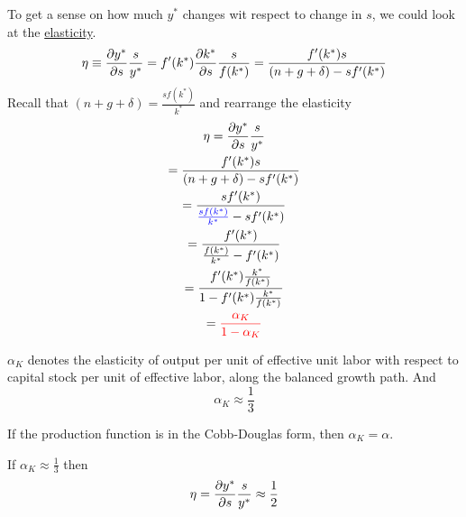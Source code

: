 \documentclass[11pt]{article}
\begin{document}
			\par To get a sense on how much $y^*$ changes wit respect to change in $s$, we could look at the \ul{elasticity}.
			\begin{equation}
				\eta \equiv \frac{\partial{y^*}}{\partial{s}}\frac{s}{y^*} = f'(k^*) \frac{\partial{k^*}}{\partial{s}} \frac{s}{f(k^*)} = \frac{f'(k^*)s}{(n+g+\delta) - sf'(k^*)}
			\end{equation}
			Recall that $(n+g+\delta) = \frac{sf(k^*)}{k^*}$ and rearrange the elasticity
			\begin{gather}
				\eta = \frac{\partial{y^*}}{\partial{s}}\frac{s}{y^*} \\
				= \frac{f'(k^*)s}{(n+g+\delta) - sf'(k^*)} \\
				= \frac{s f'(k^*)}{\textcolor{blue}{\frac{s f(k^*)}{k^*}} - sf'(k^*)} \\
				= \frac{f'(k^*)}{\frac{f(k^*)}{k^*} - f'(k^*)} \\
				= \frac{f'(k^*) \frac{k^*}{f(k^*)}}{1 - f'(k^*)\frac{k^*}{f(k^*)}} \\
				= \textcolor{red}{
					\frac{\alpha_K}{1 - \alpha_K}
					}
			\end{gather}
			
			\begin{remark}
				$\alpha_K$ denotes the elasticity of output per unit of effective unit labor with respect to capital stock per unit of effective labor, along the balanced growth path. And
				\[
					\alpha_K \approx \frac{1}{3}
				\]
			\end{remark}
			
			\begin{remark}
				If the production function is in the Cobb-Douglas form, then $\alpha_K = \alpha$.
			\end{remark}
			
			\begin{example}
				If $\alpha_K \approx \frac{1}{3}$ then \[\eta = \frac{\partial{y^*}}{\partial{s}} \frac{s}{y^*} \approx \frac{1}{2}\]
			\end{example}
			
\end{document}
